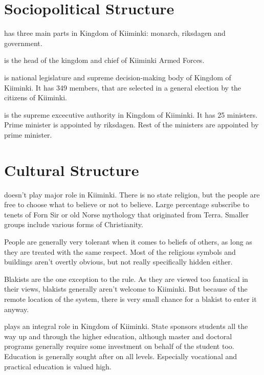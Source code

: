 \documentclass{tufte-book}
\begin{document}
\chapter{Sociopolitical Structure}
\label{ch:sociopolitical-structure}

 has three main parts in Kingdom of Kiiminki:
monarch, riksdagen and government.

 is the head of the kingdom and chief of Kiiminki Armed
Forces. 

 is national legislature and supreme decision-making
body of Kingdom of Kiiminki. It has 349 members, that are selected in a
general election by the citizens of Kiiminki.

 is the supreme excecutive authority in Kingdom of 
Kiiminki. It has 25 ministers. Prime minister is appointed by riksdagen. Rest
of the ministers are appointed by prime minister.

\chapter{Cultural Structure}
\label{ch:cultural-structure}

 doesn't play major role in Kiiminki. There is no state
religion, but the people are free to choose what to believe or not to believe.
Large percentage subscribe to tenets of Forn Si\dh r or old Norse mythology
that originated from Terra. Smaller groups include various forms of
Christianity.

People are generally very tolerant when it comes to beliefs of others, as long
as they are treated with the same respect. Most of the religious symbols and
buildings aren't overtly obvious, but not really specifically hidden either.

Blakists are the one exception to the rule. As they are viewed too fanatical
in their views, blakists generally aren't welcome to Kiiminki. But because of
the remote location of the system, there is very small chance for a blakist to
enter it anyway.

 plays an integral role in Kingdom of Kiiminki. State
sponsors students all the way up and through the higher education, although
master and doctoral programs generally require some investment on behalf of
the student too. Education is generally sought after on all levels. Especially
vocational and practical education is valued high.
\end{document}
